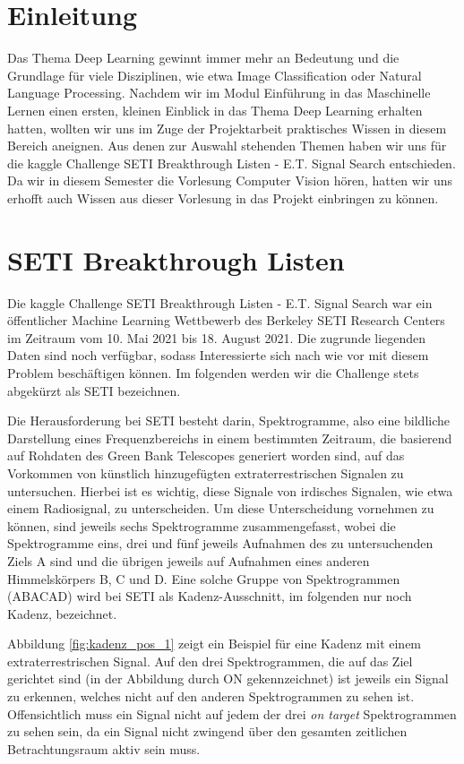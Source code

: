 \documentclass[12pt, a4paper]{article}
\begin{document}
\tableofcontents
\thispagestyle{empty}
\newpage

\section{Einleitung}
\onehalfspacing
Das Thema Deep Learning gewinnt immer mehr an Bedeutung und die Grundlage für viele Disziplinen, wie etwa Image Classification oder Natural Language Processing. Nachdem wir im Modul Einführung in das Maschinelle Lernen einen ersten, kleinen Einblick in das Thema Deep Learning erhalten hatten, wollten wir uns im Zuge der Projektarbeit praktisches Wissen in diesem Bereich aneignen. Aus denen zur Auswahl stehenden Themen haben wir uns für die kaggle Challenge SETI Breakthrough Listen - E.T. Signal Search entschieden. Da wir in diesem Semester die Vorlesung Computer Vision hören, hatten wir uns erhofft auch Wissen aus dieser Vorlesung in das Projekt einbringen zu können. 

\section{SETI Breakthrough Listen}
Die kaggle Challenge SETI Breakthrough Listen - E.T. Signal Search war ein öffentlicher Machine Learning Wettbewerb des Berkeley SETI Research Centers im Zeitraum vom 10. Mai 2021 bis 18. August 2021. Die zugrunde liegenden Daten sind noch verfügbar, sodass Interessierte sich nach wie vor mit diesem Problem beschäftigen können. Im folgenden werden wir die Challenge stets abgekürzt als SETI bezeichnen. 

Die Herausforderung bei SETI besteht darin, Spektrogramme, also eine bildliche Darstellung eines Frequenzbereichs in einem bestimmten Zeitraum, die basierend auf Rohdaten des Green Bank Telescopes generiert worden sind, auf das Vorkommen von künstlich hinzugefügten extraterrestrischen Signalen zu untersuchen. Hierbei ist es wichtig, diese Signale von irdisches Signalen, wie etwa einem Radiosignal, zu unterscheiden. Um diese Unterscheidung vornehmen zu können, sind jeweils sechs Spektrogramme zusammengefasst, wobei die Spektrogramme eins, drei und fünf jeweils Aufnahmen des zu untersuchenden Ziels \glqq A\grqq{} sind und die übrigen jeweils auf Aufnahmen eines anderen Himmelskörpers \glqq B\grqq{}, \glqq C\grqq{} und \glqq D\grqq{}. Eine solche Gruppe von Spektrogrammen (ABACAD) wird bei SETI als Kadenz-Ausschnitt, im folgenden nur noch \glqq Kadenz\grqq{}, bezeichnet.

Abbildung \ref{fig:kadenz_pos_1} zeigt ein Beispiel für eine Kadenz mit einem extraterrestrischen Signal. Auf den drei Spektrogrammen, die auf das Ziel gerichtet sind (in der Abbildung durch \glqq ON\grqq{} gekennzeichnet) ist jeweils ein Signal zu erkennen, welches nicht auf den anderen Spektrogrammen zu sehen ist. Offensichtlich muss ein Signal nicht auf jedem der drei \emph{on target} Spektrogrammen zu sehen sein, da ein Signal nicht zwingend über den gesamten zeitlichen Betrachtungsraum aktiv sein muss.
\end{document}
